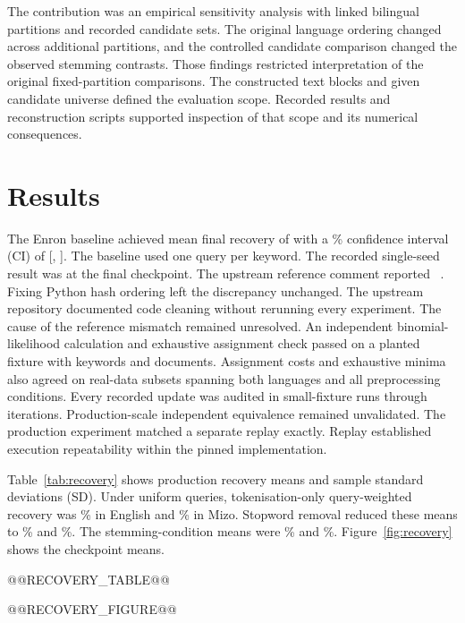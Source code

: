 \documentclass[12pt]{article}
\begin{document}
The contribution was an empirical sensitivity analysis with linked bilingual partitions and recorded candidate sets. The original language ordering changed across additional partitions, and the controlled candidate comparison changed the observed stemming contrasts. Those findings restricted interpretation of the original fixed-partition comparisons. The constructed text blocks and given candidate universe defined the evaluation scope. Recorded results and reconstruction scripts supported inspection of that scope and its numerical consequences.

\section{Results}
The Enron baseline achieved mean final recovery of \EnronMean{} with a \ConfidencePercent{}\% confidence interval (CI) of [\EnronLow{}, \EnronHigh{}]. The baseline used one query per keyword. The recorded single-seed result was \SmokeObserved{} at the final checkpoint. The upstream reference comment reported \SmokeExpected{}~\cite{ihopcode}. Fixing Python hash ordering left the discrepancy unchanged. The upstream repository documented code cleaning without rerunning every experiment. The cause of the reference mismatch remained unresolved. An independent binomial-likelihood calculation and exhaustive assignment check passed on a planted fixture with \IndependentKeywords{} keywords and \IndependentDocuments{} documents. Assignment costs and exhaustive minima also agreed on \RealCheckCases{} real-data subsets spanning both languages and all preprocessing conditions. Every recorded update was audited in \IterativeCases{} small-fixture runs through \IterativeSteps{} iterations. Production-scale independent equivalence remained unvalidated. The production experiment matched a separate replay exactly. Replay established execution repeatability within the pinned implementation.

Table~\ref{tab:recovery} shows production recovery means and sample standard deviations (SD). Under uniform queries, tokenisation-only query-weighted recovery was \ENTokenUniformPercent{}\% in English and \LUSTokenUniformPercent{}\% in Mizo. Stopword removal reduced these means to \ENStopUniformPercent{}\% and \LUSStopUniformPercent{}\%. The stemming-condition means were \ENStemUniformPercent{}\% and \LUSStemUniformPercent{}\%. Figure~\ref{fig:recovery} shows the checkpoint means.

@@RECOVERY_TABLE@@

@@RECOVERY_FIGURE@@
\end{document}

